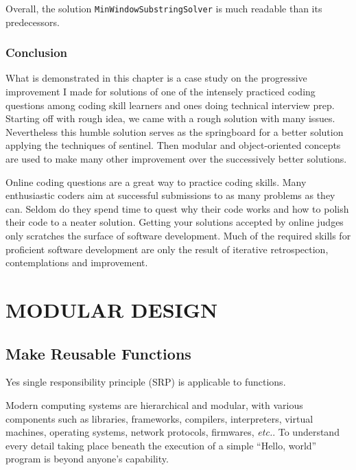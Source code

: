 \documentclass[oneside,11pt]{book}
\theoremstyle{definition}
\theoremstyle{remark}
\newcommand{\code}[1]{\mbox{\lstinline{#1}}}
\begin{document}
Overall, the solution \code{MinWindowSubstringSolver} is much readable than its predecessors.

\section{Conclusion}\label{sec:minWindowSubstringConclusion}

What is demonstrated in this chapter is a case study on the progressive improvement I made for
solutions of one of the intensely practiced coding questions among coding skill learners and ones
doing technical interview prep.
Starting off with rough idea, we came with a rough solution with many issues.
Nevertheless this humble solution serves as the springboard for a better solution applying the
techniques of sentinel.
Then modular and object-oriented concepts are used to make many other improvement over the
successively better solutions.

Online coding questions are a great way to practice coding skills.
Many enthusiastic coders aim at successful submissions to as many problems as they can.
Seldom do they spend time to quest why their code works and how to polish their code to a neater
solution.
Getting your solutions accepted by online judges only scratches the surface of software development.
Much of the required skills for proficient software development are only the result of
iterative retrospection, contemplations and improvement.
\clearpage{}

    \part{\uppercase{Modular Design}}\label{prt:modularDesign}

    \clearpage{}\chapter{Make Reusable Functions}\label{ch:reusableFunctions}

Yes single responsibility principle (SRP) is applicable to functions.

Modern computing systems are hierarchical and modular, with various components such as libraries,
frameworks, compilers, interpreters, virtual machines, operating systems, network protocols,
firmwares, \textit{etc.}.
To understand every detail taking place beneath the execution of a simple ``Hello, world''
program is beyond anyone's capability.
\end{document}
